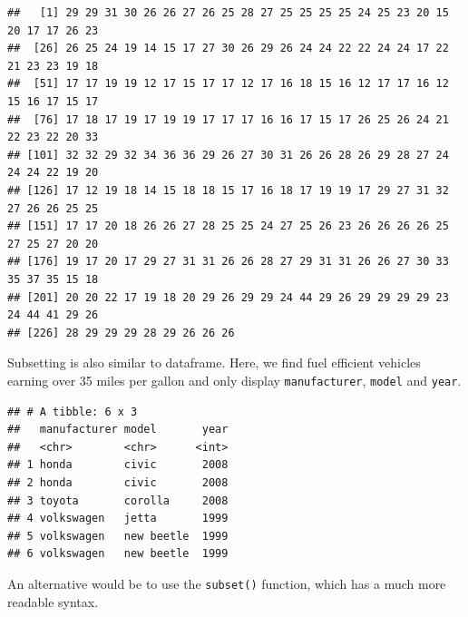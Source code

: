 \documentclass[]{book}
\newenvironment{Shaded}{\begin{snugshade}}{\end{snugshade}}
\newcommand{\KeywordTok}[1]{\textcolor[rgb]{0.13,0.29,0.53}{\textbf{#1}}}
\newcommand{\DecValTok}[1]{\textcolor[rgb]{0.00,0.00,0.81}{#1}}
\newcommand{\StringTok}[1]{\textcolor[rgb]{0.31,0.60,0.02}{#1}}
\newcommand{\CommentTok}[1]{\textcolor[rgb]{0.56,0.35,0.01}{\textit{#1}}}
\newcommand{\OperatorTok}[1]{\textcolor[rgb]{0.81,0.36,0.00}{\textbf{#1}}}
\newcommand{\NormalTok}[1]{#1}
\begin{document}
\begin{Shaded}
\end{Shaded}

\begin{verbatim}
##   [1] 29 29 31 30 26 26 27 26 25 28 27 25 25 25 25 24 25 23 20 15 20 17 17 26 23
##  [26] 26 25 24 19 14 15 17 27 30 26 29 26 24 24 22 22 24 24 17 22 21 23 23 19 18
##  [51] 17 17 19 19 12 17 15 17 17 12 17 16 18 15 16 12 17 17 16 12 15 16 17 15 17
##  [76] 17 18 17 19 17 19 19 17 17 17 16 16 17 15 17 26 25 26 24 21 22 23 22 20 33
## [101] 32 32 29 32 34 36 36 29 26 27 30 31 26 26 28 26 29 28 27 24 24 24 22 19 20
## [126] 17 12 19 18 14 15 18 18 15 17 16 18 17 19 19 17 29 27 31 32 27 26 26 25 25
## [151] 17 17 20 18 26 26 27 28 25 25 24 27 25 26 23 26 26 26 26 25 27 25 27 20 20
## [176] 19 17 20 17 29 27 31 31 26 26 28 27 29 31 31 26 26 27 30 33 35 37 35 15 18
## [201] 20 20 22 17 19 18 20 29 26 29 29 24 44 29 26 29 29 29 29 23 24 44 41 29 26
## [226] 28 29 29 29 28 29 26 26 26
\end{verbatim}

Subsetting is also similar to dataframe. Here, we find fuel efficient
vehicles earning over 35 miles per gallon and only display
\texttt{manufacturer}, \texttt{model} and \texttt{year}.

\begin{Shaded}
\end{Shaded}

\begin{verbatim}
## # A tibble: 6 x 3
##   manufacturer model       year
##   <chr>        <chr>      <int>
## 1 honda        civic       2008
## 2 honda        civic       2008
## 3 toyota       corolla     2008
## 4 volkswagen   jetta       1999
## 5 volkswagen   new beetle  1999
## 6 volkswagen   new beetle  1999
\end{verbatim}

An alternative would be to use the \texttt{subset()} function, which has
a much more readable syntax.
\end{document}
